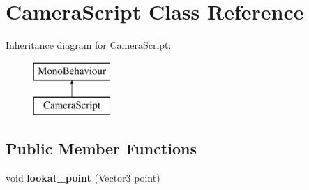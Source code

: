 \hypertarget{class_camera_script}{}\section{Camera\+Script Class Reference}
\label{class_camera_script}
Inheritance diagram for Camera\+Script\+:\begin{figure}[H]
\begin{center}
\leavevmode
\includegraphics[height=2.000000cm]{class_camera_script}
\end{center}
\end{figure}
\subsection*{Public Member Functions}
\begin{DoxyCompactItemize}
\item 
\mbox{\label{class_camera_script_acb2cca3e4fcf99850d937cf05f167014}} 
void {\bfseries lookat\+\_\+point} (Vector3 point)
\end{DoxyCompactItemize}
